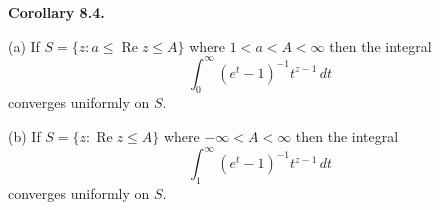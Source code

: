 \textbf{Corollary 8.4.}

(a) If $S = \{z : a \leq \operatorname{Re} z \leq A\}$ where $1 < a < A < \infty$ then the integral
$$\int_0^\infty (e^t - 1)^{-1} t^{z-1} \, dt$$
converges uniformly on $S$.

(b) If $S = \{z : \operatorname{Re} z \leq A\}$ where $-\infty < A < \infty$ then the integral
$$\int_1^\infty (e^t - 1)^{-1} t^{z-1} \, dt$$
converges uniformly on $S$.
